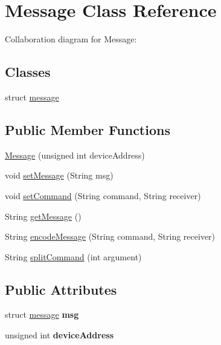 \hypertarget{class_message}{}\section{Message Class Reference}
\label{class_message}


Collaboration diagram for Message\+:
\subsection*{Classes}
\begin{DoxyCompactItemize}
\item 
struct \hyperlink{struct_message_1_1message}{message}
\end{DoxyCompactItemize}
\subsection*{Public Member Functions}
\begin{DoxyCompactItemize}
\item 
\hyperlink{class_message_a917d33658059b92ef6fe29f523cfc3d3}{Message} (unsigned int device\+Address)
\item 
void \hyperlink{class_message_a05999d64722c0f0149391b684db391d0}{set\+Message} (String msg)
\item 
void \hyperlink{class_message_af187cbc29c2aa424efe7e442699cd167}{set\+Command} (String command, String receiver)
\item 
String \hyperlink{class_message_a50d4906b755edfcee40cb5f80fe4ac32}{get\+Message} ()
\item 
String \hyperlink{class_message_ac430b803b41d61f232a2bbfbba660623}{encode\+Message} (String command, String receiver)
\item 
String \hyperlink{class_message_a89957e73ddc9c7ecf3f79901a09e47ca}{split\+Command} (int argument)
\end{DoxyCompactItemize}
\subsection*{Public Attributes}
\begin{DoxyCompactItemize}
\item 
\mbox{\label{class_message_a17a538ab0649f75f6a5f84ed384fafbb}} 
struct \hyperlink{struct_message_1_1message}{message} {\bfseries msg}
\item 
\mbox{\label{class_message_ae1b021db8bff675a1709dda1e2037385}} 
unsigned int {\bfseries device\+Address}
\end{DoxyCompactItemize}


